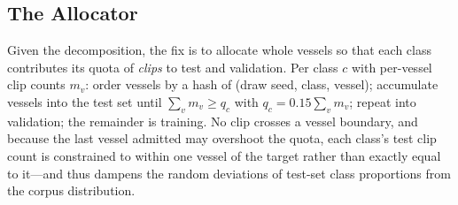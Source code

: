 ﻿\documentclass[journal]{IEEEtran}
\begin{document}
\subsection{The Allocator}
Given the decomposition, the fix is to allocate whole vessels so that each class contributes its
quota of \emph{clips} to test and validation. Per class $c$ with per-vessel clip counts $m_v$:
order vessels by a hash of (draw seed, class, vessel); accumulate vessels into the test set until
$\sum_v m_v \ge q_c$ with $q_c = 0.15\sum_v m_v$; repeat into validation; the remainder is
training. No clip crosses a vessel boundary, and because the last vessel admitted may overshoot
the quota, each class's test clip count is constrained to within one vessel of the target rather
than exactly equal to it---and thus dampens the random deviations of test-set class proportions
from the corpus distribution.
\end{document}
